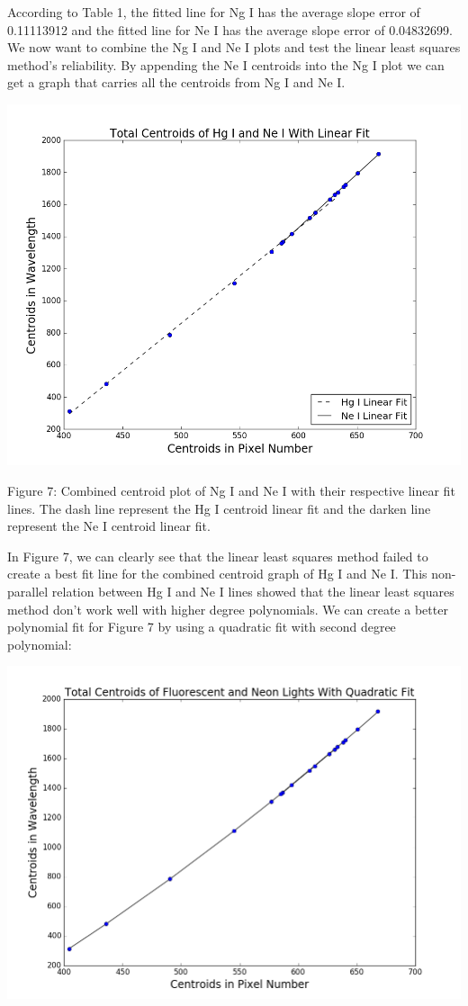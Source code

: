 \documentclass[onecolumn, 12pt, a4paper]{article}
\begin{document}
According to Table 1, the fitted line for Ng I has the average slope error of 0.11113912 and the fitted line for Ne I has the average slope error of 0.04832699. We now want to combine the Ng I and Ne I plots and test the linear least squares method's reliability. By appending the Ne I centroids into the Ng I plot we can get a graph that carries all the centroids from Ng I and Ne I. 
\newline
\centerline{\includegraphics[scale = .4]{combcents.png}}
\begin{flushleft}
Figure 7: Combined centroid plot of Ng I and Ne I with their respective linear fit lines. The dash line represent the Hg I centroid linear fit and the darken line represent the Ne I centroid linear fit.
\end{flushleft}

In Figure 7, we can clearly see that the linear least squares method failed to create a best fit line for the combined centroid graph of Hg I and Ne I. This non-parallel relation between Hg I and Ne I lines showed that the linear least squares method don't work well with higher degree polynomials. We can create a better polynomial fit for Figure 7 by using a quadratic fit with second degree polynomial: 
\newline
\centerline{\includegraphics[scale = .38]{comcents2.png}}
\end{document}

